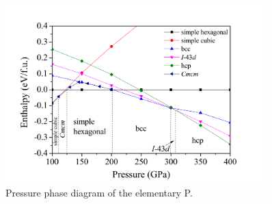 \documentclass[a4paper,10pt]{article}
\begin{document}
\begin{figure}[h]
 \centering
 \includegraphics[width=0.9\textwidth]{phosphorus_v1.png} %
 \caption{Pressure phase diagram of the elementary P.}
 \label{phosphorous:enthalpy}
\end{figure}

\end{document}
